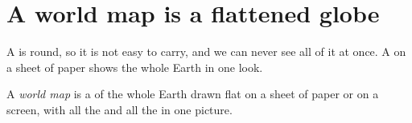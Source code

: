 \section{A world map is a flattened globe}

A  is round, so it is not easy to carry, and we can never see all of
it at once. A  on a sheet of paper shows the whole Earth in one look.

\begin{definition}\label{def:g3:continents-and-oceans:world-map}
A \emph{world map} is a  of the whole Earth drawn flat
on a sheet of paper or on a screen, with all the  and all the
 in one picture.
\end{definition}

